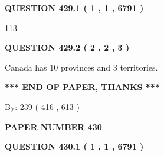 \documentclass[12pt]{article}
\begin{document}
{\textbf{\Large{QUESTION
429.1 
 ( 1 , 1 , 6791 )
}}}
  
  
 
 
\noindent{}

113
 
 
  
\vspace{0.2in}
  
{\textbf{\Large{QUESTION
429.2 
 ( 2 , 2 , 3 )
}}}
  
  
 
 
\noindent{}
 
 
Canada has 10  provinces and 3 territories.
 
 
 
 
   
   
 \vspace{0.2in}
 
   
   
   
   
\vspace{1.0in} 
{\textbf{\large{ *** END OF PAPER, THANKS *** }}} 
   
   
\hspace{1.0in} By: 
 239 ( 416 ,  613 )
   
   
   
   
\newpage 
\setcounter{page}{ 
   430001 } 
   
   
   
   
 {\textbf{ \Large{ PAPER NUMBER  430  }}}
   
   
\vspace{0.2in}
   
   
   
   
   
   
 \vspace{0.2in}
 
 
 
 
   
   
  
\vspace{0.2in}
  
{\textbf{\Large{QUESTION
430.1 
 ( 1 , 1 , 6791 )
}}}
  
  
 
 
\noindent{}
\end{document}
